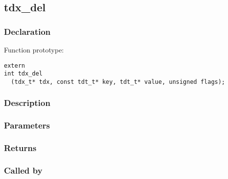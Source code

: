 
\newpage
\subsection{tdx\_del}
\subsubsection{Declaration} Function prototype:

\begin{verbatim}
extern
int tdx_del
  (tdx_t* tdx, const tdt_t* key, tdt_t* value, unsigned flags);
\end{verbatim}

\subsubsection{Description}



 

\subsubsection{Parameters}
\subsubsection{Returns}
\subsubsection{Called by}
